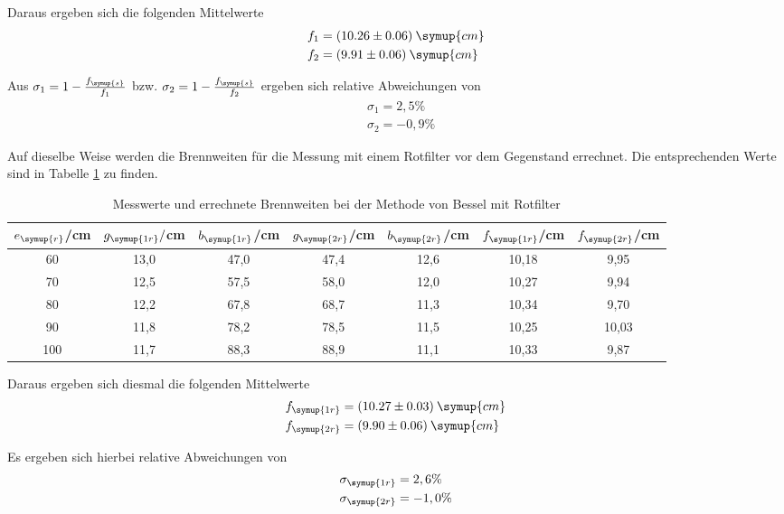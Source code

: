 Daraus ergeben sich die folgenden Mittelwerte
\begin{align*}
  &f_1 = (10.26 \pm 0.06) \: \symup{cm} \\
  &f_2 = (9.91 \pm 0.06) \: \symup{cm}
\end{align*}

Aus $\sigma_1 = 1 - \frac{f_{\symup{s}}}{f_1}$ bzw. $\sigma_2 = 1 - \frac{f_{\symup{s}}}{f_2}$ ergeben sich relative Abweichungen von
\begin{align*}
  &\sigma_1 = 2,5 \% \\
  &\sigma_2 = -0,9 \%
\end{align*}

Auf dieselbe Weise werden die Brennweiten für die Messung mit einem Rotfilter vor dem Gegenstand errechnet. Die
entsprechenden Werte sind in Tabelle \ref{tab:besselrot} zu finden.
\begin{table}[H]
  \centering
  \caption{Messwerte und errechnete Brennweiten bei der Methode von Bessel mit Rotfilter}
  \label{tab:besselrot}
  \begin{tabular}{c c c c c c c}
    \toprule
    $e_{\symup{r}}$/cm  & $g_{\symup{1r}}/$cm & $b_{\symup{1r}}$/cm & $g_{\symup{2r}}$/cm & $b_{\symup{2r}}$/cm & $f_{\symup{1r}}$/cm & $f_{\symup{2r}}$/cm \\
    \midrule
    60  &   13,0 &  47,0  &  47,4  &  12,6 & 10,18 & 9,95  \\
    70   &  12,5 &  57,5  &  58,0  &  12,0 & 10,27 & 9,94 \\
    80   &  12,2 &  67,8  &  68,7  &  11,3 & 10,34 & 9,70 \\
    90   &  11,8 &  78,2  &  78,5  &  11,5 & 10,25 & 10,03 \\
    100  &  11,7 &  88,3  &  88,9  &  11,1 & 10,33 & 9,87 \\
    \bottomrule
  \end{tabular}
\end{table}

Daraus ergeben sich diesmal die folgenden Mittelwerte
\begin{align*}
  &f_{\symup{1r}} = (10.27 \pm 0.03) \: \symup{cm} \\
  &f_{\symup{2r}} = (9.90 \pm 0.06) \: \symup{cm}
\end{align*}

Es ergeben sich hierbei relative Abweichungen von
\begin{align*}
  &\sigma_{\symup{1r}} = 2,6 \% \\
  &\sigma_{\symup{2r}} = -1,0 \%
\end{align*}


